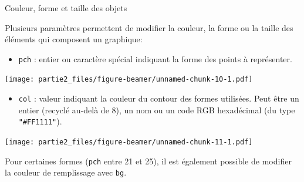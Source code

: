 \documentclass[12pt,ignorenonframetext,]{beamer}
\providecommand{\tightlist}{%
  \setlength{\itemsep}{0pt}\setlength{\parskip}{0pt}}
\begin{document}
\begin{frame}[fragile]{Couleur, forme et taille des objets}
\protect\hypertarget{couleur-forme-et-taille-des-objets}{}

Plusieurs paramètres permettent de modifier la couleur, la forme ou la
taille des éléments qui composent un graphique:

\begin{itemize}
\tightlist
\item
  \pause \texttt{pch} : entier ou caractère spécial indiquant la forme
  des points à représenter.
\end{itemize}

\texttt{[image: partie2\_files/figure-beamer/unnamed-chunk-10-1.pdf]}

\begin{itemize}
\tightlist
\item
  \pause \texttt{col} : valeur indiquant la couleur du contour des
  formes utilisées. Peut être un entier (recyclé au-delà de 8), un nom
  ou un code RGB hexadécimal (du type \texttt{"\#FF1111"}). \small  
\end{itemize}

\texttt{[image: partie2\_files/figure-beamer/unnamed-chunk-11-1.pdf]}

Pour certaines formes (\texttt{pch} entre 21 et 25), il est également
possible de modifier la couleur de remplissage avec \texttt{bg}.

\end{frame}
\end{document}
